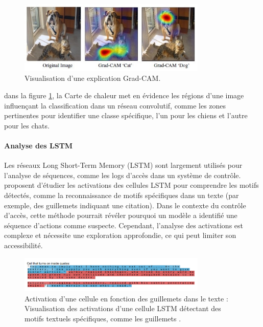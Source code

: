 \begin{figure}[h]
    \centering
    \includegraphics[width=0.8\textwidth]{My-Thesis/Chap1/images/gradcam_visualization.png}
    \caption{Visualisation d'une explication Grad-CAM.}
    \label{fig:gradcam}
\end{figure}

dans la figure \ref{fig:gradcam}, la Carte de chaleur met en évidence les régions d’une image influençant la classification dans un réseau convolutif, comme les zones pertinentes pour identifier une classe spécifique, l'un pour les chiens et l'autre pour les chats. \citep{GradCAMImage}

\paragraph{Analyse des LSTM}  
Les réseaux Long Short-Term Memory (LSTM) sont largement utilisés pour l’analyse de séquences, comme les logs d’accès dans un système de contrôle. \citet{karpathy2015visualizing} proposent d’étudier les activations des cellules LSTM pour comprendre les motifs détectés, comme la reconnaissance de motifs spécifiques dans un texte (par exemple, des guillemets indiquant une citation). Dans le contexte du contrôle d’accès, cette méthode pourrait révéler pourquoi un modèle a identifié une séquence d’actions comme suspecte. Cependant, l’analyse des activations est complexe et nécessite une exploration approfondie, ce qui peut limiter son accessibilité.


\begin{figure}[h]
    \centering
    \includegraphics[width=0.8\textwidth]{My-Thesis/Chap1/images/lstm_activation.png}
    \caption{Activation d’une cellule en fonction des guillemets dans le texte : Visualisation des activations d’une cellule LSTM détectant des motifs textuels spécifiques, comme les guillemets \citep{karpathy2015visualizing}.}
    \label{fig:lstm}
\end{figure}

